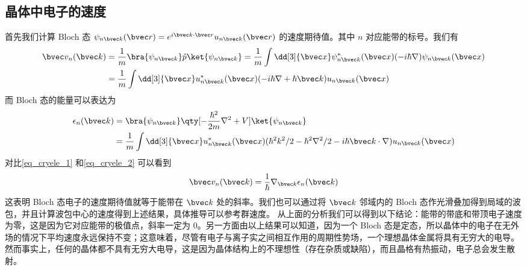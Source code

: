 \subsection{晶体中电子的速度}
首先我们计算 Bloch 态 $\psi_{n\bvec k}(\bvec r)=e^{i\bvec k\cdot \bvec r}u_{n\bvec k}(\bvec r)$ 的速度期待值。其中 $n$ 对应能带的标号。我们有
\begin{equation}\label{eq_cryele_1}
\begin{aligned}
\bvec v_n(\bvec k)&=\frac{1}{m}\bra{\psi_{n\bvec k}}\hat p\ket{\psi_{n\bvec k}}=\frac{1}{m}\int \dd[3]{\bvec x}\psi_{n\bvec k}^*(\bvec x)(-i\hbar\nabla)\psi_{n\bvec k}(\bvec x)\\
&=\frac{1}{m}\int \dd[3]{\bvec x}u_{n\bvec k}^*(\bvec x)(-i\hbar\nabla+\hbar \bvec k)u_{n\bvec k}(\bvec x)
\end{aligned}
\end{equation}
而 Bloch 态的能量可以表达为
\begin{equation}\label{eq_cryele_2}
\begin{aligned}
\epsilon_{n}(\bvec k)&=\bra{\psi_{n\bvec k}} \qty[-\frac{\hbar^2}{2m}\nabla^2+V]\ket{\psi_{n\bvec k}}
\\&=\frac{1}{m}\int \dd[3]{\bvec x} u_{n\bvec k}^*(\bvec x)(\hbar^2k^2/2-\hbar^2\nabla^2/2-i\hbar\bvec k\cdot \nabla)u_{n\bvec k}(\bvec x)
\end{aligned}
\end{equation}
对比\autoref{eq_cryele_1} 和\autoref{eq_cryele_2} 可以看到
\begin{equation}\label{eq_cryele_3}
\bvec v_n(\bvec k)=\frac{1}{\hbar}\nabla_{\bvec k}\epsilon_{n}(\bvec k)
\end{equation}
这表明 Bloch 态电子的速度期待值就等于能带在 $\bvec k$ 处的斜率。我们也可以通过将 $\bvec k$ 邻域内的 Bloch 态作光滑叠加得到局域的波包，并且计算波包中心的速度得到上述结果，具体推导可以参考群速度。 从上面的分析我们可以得到以下结论：能带的带底和带顶电子速度为零，这是因为它对应能带的极值点，斜率一定为 $0$。另一方面由以上结果可以知道，因为一个 Bloch 态是定态，所以晶体中的电子在无外场的情况下平均速度永远保持不变；这意味着，尽管有电子与离子实之间相互作用的周期性势场，一个理想晶体金属将具有无穷大的电导。然而事实上，任何的晶体都不具有无穷大电导，这是因为晶体结构上的不理想性（存在杂质或缺陷），而且晶格有热振动，电子总会发生散射。
